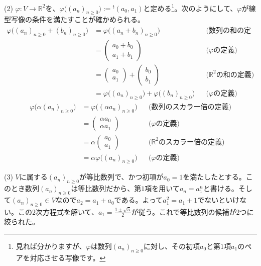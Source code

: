 \noindent (2) $\varphi\colon V\rightarrow \mathbb{R}^2$を、$\varphi\bigl((a_n)_{n \geq 0}\bigr) := {}^t(a_0, a_1)$と定める\footnote{見れば分かりますが、$\varphi$は数列$(a_n)_{n \geq 0}$に対し、その初項$a_0$と第$1$項$a_1$のペアを対応させる写像です。}。次のようにして、$\varphi$が線型写像の条件を満たすことが確かめられる。
\begin{align*}
\varphi\bigl((a_n)_{n\geq 0} + (b_n)_{n\geq 0}\bigr) &= \varphi\bigl((a_n + b_n)_{n\geq 0}\bigr) & & \text{(数列の和の定義)} \\
&= 
\begin{pmatrix}
a_0 + b_0 \\
a_1 + b_1
\end{pmatrix}
& & \text{($\varphi$の定義)} \\
&= 
\begin{pmatrix}
a_0 \\
a_1
\end{pmatrix}
+
\begin{pmatrix}
b_0 \\
b_1
\end{pmatrix}
& & \text{($\mathbb{R}^2$の和の定義)} \\
&= \varphi\bigl((a_n)_{n\geq 0}\bigr) + \varphi\bigl((b_n)_{n\geq 0}\bigr) & & \text{($\varphi$の定義)}
\end{align*}
\begin{align*}
\varphi\bigl(\alpha(a_n)_{n\geq 0}\bigr) &= \varphi\bigl((\alpha a_n)_{n\geq 0}\bigr) & & \text{(数列のスカラー倍の定義)} \\
&= 
\begin{pmatrix}
\alpha a_0 \\
\alpha a_1
\end{pmatrix}
& & \text{($\varphi$の定義)} \\
&= 
\alpha
\begin{pmatrix}
a_0 \\
a_1
\end{pmatrix}
& & \text{($\mathbb{R}^2$のスカラー倍の定義)} \\
&= \alpha \varphi\bigl((a_n)_{n\geq 0}\bigr) & & \text{($\varphi$の定義)}
\end{align*}

\noindent (3) $V$に属する$(a_n)_{n \geq 0}$が等比数列で、かつ初項が$a_0 = 1$を満たしたとする。このとき数列$(a_n)_{n \geq 0}$は等比数列だから、第$1$項を用いて$a_n = a_1^n$と書ける。そして$(a_n)_{n \geq 0}\in V$なので$a_2 = a_1 + a_0$である。よって$a_1^2 = a_1 + 1$でないといけない。この$2$次方程式を解いて、$a_1 = \frac{1 \pm \sqrt{5}}{2}$が従う。これで等比数列の候補が$2$つに絞られた。

